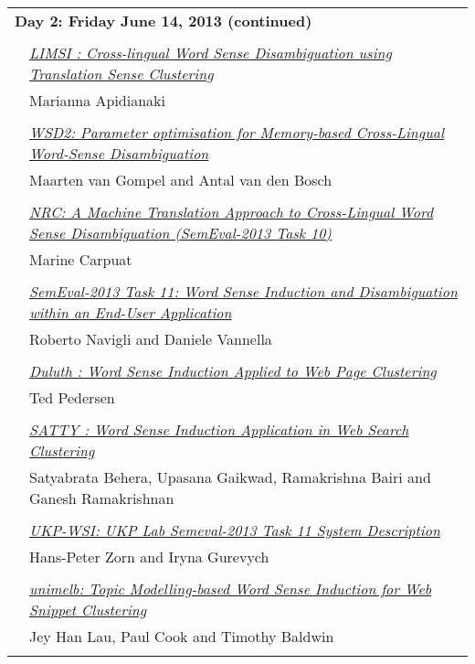 \begin{tabular}{p{20mm}p{138mm}}
\\
\multicolumn{2}{l}{\bf Day 2: Friday June 14, 2013 (continued)} \\\\
 & \hyperlink{page.178}{\em LIMSI : Cross-lingual Word Sense Disambiguation using Translation Sense Clustering}\\
         & Marianna Apidianaki \\
\\

 & \hyperlink{page.183}{\em WSD2: Parameter optimisation for Memory-based Cross-Lingual Word-Sense Disambiguation}\\
         & Maarten van Gompel and Antal van den Bosch \\
\\

 & \hyperlink{page.188}{\em NRC: A Machine Translation Approach to Cross-Lingual Word Sense Disambiguation (SemEval-2013 Task 10)}\\
         & Marine Carpuat \\
\\

 & \hyperlink{page.193}{\em SemEval-2013 Task 11: Word Sense Induction and Disambiguation within an End-User Application}\\
         & Roberto Navigli and Daniele Vannella \\
\\

 & \hyperlink{page.202}{\em Duluth : Word Sense Induction Applied to Web Page Clustering}\\
         & Ted Pedersen \\
\\

 & \hyperlink{page.207}{\em SATTY : Word Sense Induction Application in Web Search Clustering}\\
         & Satyabrata Behera, Upasana Gaikwad, Ramakrishna Bairi and Ganesh Ramakrishnan \\
\\

 & \hyperlink{page.212}{\em UKP-WSI: UKP Lab Semeval-2013 Task 11 System Description}\\
         & Hans-Peter Zorn and Iryna Gurevych \\
\\

 & \hyperlink{page.217}{\em unimelb: Topic Modelling-based Word Sense Induction for Web Snippet Clustering}\\
         & Jey Han Lau, Paul Cook and Timothy Baldwin \\
\\


\end{tabular}
